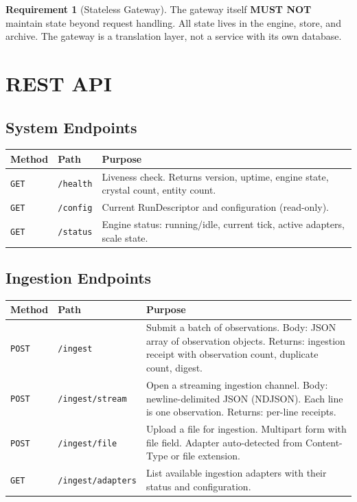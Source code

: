 \documentclass[11pt,a4paper,twoside]{article}
\theoremstyle{definition}
\newtheorem{requirement}{Requirement}[section]
\theoremstyle{plain}
\theoremstyle{remark}
\begin{document}
\begin{requirement}[Stateless Gateway]\label{req:stateless}
The gateway itself \textbf{MUST NOT} maintain state beyond request
handling. All state lives in the engine, store, and archive. The
gateway is a translation layer, not a service with its own database.
\end{requirement}


\section{REST API}\label{sec:gw:rest}

\subsection{System Endpoints}

\begin{longtable}{l l p{6.5cm}}
\toprule
\textbf{Method} & \textbf{Path} & \textbf{Purpose} \\
\midrule
\endfirsthead
\midrule
\endhead
\bottomrule
\endfoot
\texttt{GET} & \texttt{/health} & Liveness check. Returns version,
  uptime, engine state, crystal count, entity count. \\
\texttt{GET} & \texttt{/config} & Current RunDescriptor and
  configuration (read-only). \\
\texttt{GET} & \texttt{/status} & Engine status: running/idle, current
  tick, active adapters, scale state. \\
\end{longtable}

\subsection{Ingestion Endpoints}

\begin{longtable}{l l p{6.5cm}}
\toprule
\textbf{Method} & \textbf{Path} & \textbf{Purpose} \\
\midrule
\endfirsthead
\midrule
\endhead
\bottomrule
\endfoot
\texttt{POST} & \texttt{/ingest} & Submit a batch of observations.
  Body: JSON array of observation objects. Returns: ingestion receipt
  with observation count, duplicate count, digest. \\
\texttt{POST} & \texttt{/ingest/stream} & Open a streaming ingestion
  channel. Body: newline-delimited JSON (NDJSON). Each line is one
  observation. Returns: per-line receipts. \\
\texttt{POST} & \texttt{/ingest/file} & Upload a file for ingestion.
  Multipart form with file field. Adapter auto-detected from
  Content-Type or file extension. \\
\texttt{GET} & \texttt{/ingest/adapters} & List available ingestion
  adapters with their status and configuration. \\
\end{longtable}
\end{document}
